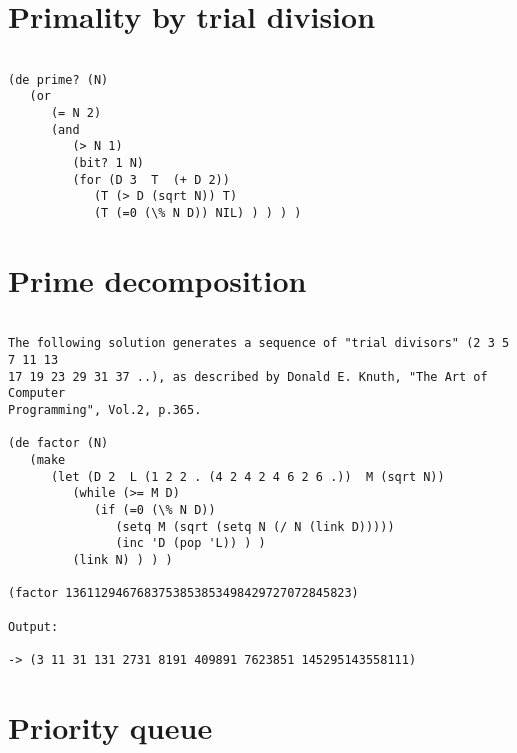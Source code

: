 \section*{Primality by trial division}

\begin{verbatim}

(de prime? (N)
   (or
      (= N 2)
      (and
         (> N 1)
         (bit? 1 N)
         (for (D 3  T  (+ D 2))
            (T (> D (sqrt N)) T)
            (T (=0 (\% N D)) NIL) ) ) ) )

\end{verbatim}

\section*{Prime decomposition}

\begin{verbatim}

The following solution generates a sequence of "trial divisors" (2 3 5 7 11 13
17 19 23 29 31 37 ..), as described by Donald E. Knuth, "The Art of Computer
Programming", Vol.2, p.365.

(de factor (N)
   (make
      (let (D 2  L (1 2 2 . (4 2 4 2 4 6 2 6 .))  M (sqrt N))
         (while (>= M D)
            (if (=0 (\% N D))
               (setq M (sqrt (setq N (/ N (link D)))))
               (inc 'D (pop 'L)) ) )
         (link N) ) ) )

(factor 1361129467683753853853498429727072845823)

Output:

-> (3 11 31 131 2731 8191 409891 7623851 145295143558111)

\end{verbatim}

\section*{Priority queue}


